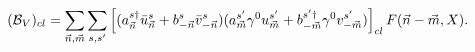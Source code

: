 \begin{equation}
\label{fermionnumberV}
({\cal B}_V)_{cl} = \sum_{{\vec n},{\vec m}} 
\sum_{s,s'} 
\left[(a^{s\dagger}_{\vec n} \bar{u}^s_{\vec n} +
b^{s}_{-{\vec n}} \bar{v}^s_{-{\vec n}})
(a^{s'}_{\vec m}\gamma^0 u^{s'}_{\vec m} +
b^{s'\dagger}_{-{\vec m}}\gamma^0 v^{s'}_{-{\vec m}})\right]_{cl}
F({\vec n}-{\vec m},X).
\end{equation}


